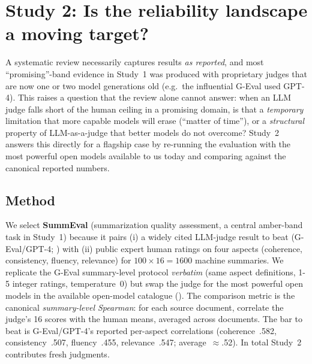 \section{Study 2: Is the reliability landscape a moving target?}\label{sec:s1b}
A systematic review necessarily captures results \emph{as reported}, and most ``promising''-band evidence in
Study~1 was produced with proprietary judges that are now one or two model generations old (e.g.\ the influential
G-Eval used GPT-4). This raises a question that the review alone cannot answer: when an LLM judge falls short of the
human ceiling in a promising domain, is that a \emph{temporary} limitation that more capable models will erase
(``matter of time''), or a \emph{structural} property of LLM-as-a-judge that better models do not overcome? Study~2
answers this directly for a flagship case by re-running the evaluation with the most powerful open models available
to us today and comparing against the canonical reported numbers.

\subsection{Method}
We select \textbf{SummEval} \citep{fabbri2021summeval} (summarization quality assessment, a central amber-band task
in Study~1) because it pairs (i) a widely cited LLM-judge result to beat (G-Eval/GPT-4; \citealp{liu2023geval})
with (ii) public expert human ratings on four aspects (coherence, consistency, fluency, relevance) for
$100\times16=1600$ machine summaries. We replicate the G-Eval summary-level protocol \emph{verbatim} (same aspect
definitions, 1-5 integer ratings, temperature~0) but swap the judge for the \ONEmodels{} most powerful open models
in the available open-model catalogue (\ONEpanel). The comparison metric is the canonical \emph{summary-level Spearman}: for each
source document, correlate the judge's 16 scores with the human means, averaged across documents. The bar to beat is
G-Eval/GPT-4's reported per-aspect correlations (coherence~.582, consistency~.507, fluency~.455, relevance~.547;
average~$\approx$.52). In total Study~2 contributes \ONEnjudg{} fresh judgments.

